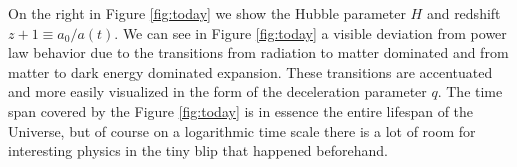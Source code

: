 On the right in Figure \ref{fig:today} we show the Hubble parameter $H$ and redshift $z+1\equiv a_0/a(t)$. We can see in Figure \ref{fig:today} a visible deviation from power law behavior due to the transitions from radiation to matter dominated and from matter to dark energy dominated expansion. These transitions are accentuated and more easily visualized in the form of the deceleration parameter $q$. The time span covered by the Figure \ref{fig:today} is in essence the entire lifespan of the Universe, but of course on a logarithmic time scale there is a lot of room for interesting physics in the tiny blip that happened beforehand.


\begin{figure}
\begin{minipage}{\linewidth}

\end{minipage}
\end{figure}
